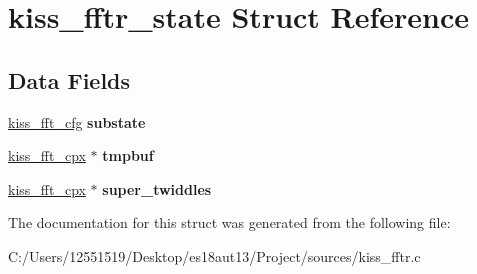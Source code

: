 \hypertarget{structkiss__fftr__state}{}\section{kiss\+\_\+fftr\+\_\+state Struct Reference}
\label{structkiss__fftr__state}
\subsection*{Data Fields}
\begin{DoxyCompactItemize}
\item 
\hypertarget{structkiss__fftr__state_acdccafcf502fec1c13450c2eae901738}{}\hyperlink{structkiss__fft__state}{kiss\+\_\+fft\+\_\+cfg} {\bfseries substate}\label{structkiss__fftr__state_acdccafcf502fec1c13450c2eae901738}

\item 
\hypertarget{structkiss__fftr__state_ae0b38b99d0ec7540abab4211093fdd99}{}\hyperlink{structkiss__fft__cpx}{kiss\+\_\+fft\+\_\+cpx} $\ast$ {\bfseries tmpbuf}\label{structkiss__fftr__state_ae0b38b99d0ec7540abab4211093fdd99}

\item 
\hypertarget{structkiss__fftr__state_ae612ac0806b0ceee4868f1829aa05e78}{}\hyperlink{structkiss__fft__cpx}{kiss\+\_\+fft\+\_\+cpx} $\ast$ {\bfseries super\+\_\+twiddles}\label{structkiss__fftr__state_ae612ac0806b0ceee4868f1829aa05e78}

\end{DoxyCompactItemize}


The documentation for this struct was generated from the following file\+:\begin{DoxyCompactItemize}
\item 
C\+:/\+Users/12551519/\+Desktop/es18aut13/\+Project/sources/kiss\+\_\+fftr.\+c\end{DoxyCompactItemize}
